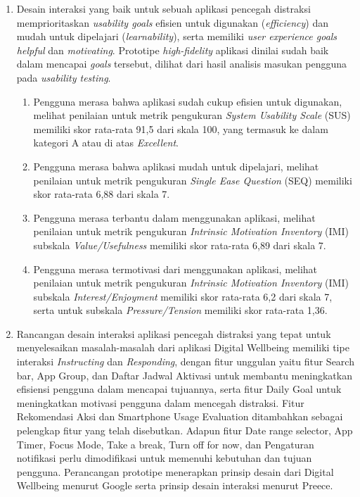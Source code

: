 \begin{enumerate}
  \item Desain interaksi yang baik untuk sebuah aplikasi pencegah distraksi memprioritaskan \textit{usability goals} efisien untuk digunakan (\textit{efficiency}) dan mudah untuk dipelajari (\textit{learnability}), serta memiliki \textit{user experience goals} \textit{helpful} dan \textit{motivating}. Prototipe \textit{high-fidelity} aplikasi dinilai sudah baik dalam mencapai \textit{goals} tersebut, dilihat dari hasil analisis masukan pengguna pada \textit{usability testing}.
    \begin{enumerate}[label=\alph*.]
      \item Pengguna merasa bahwa aplikasi sudah cukup efisien untuk digunakan, melihat penilaian untuk metrik pengukuran \textit{System Usability Scale} (SUS) memiliki skor rata-rata 91,5 dari skala 100, yang termasuk ke dalam kategori A atau di atas \textit{Excellent}. 
      
      \item Pengguna merasa bahwa aplikasi mudah untuk dipelajari, melihat penilaian untuk metrik pengukuran \textit{Single Ease Question} (SEQ) memiliki skor rata-rata 6,88 dari skala 7.
      
      \item Pengguna merasa terbantu dalam menggunakan aplikasi, melihat penilaian untuk metrik pengukuran \textit{Intrinsic Motivation Inventory} (IMI) subskala \textit{Value/Usefulness} memiliki skor rata-rata 6,89 dari skala 7.
      
      \item Pengguna merasa termotivasi dari menggunakan aplikasi, melihat penilaian untuk metrik pengukuran \textit{Intrinsic Motivation Inventory} (IMI) subskala \textit{Interest/Enjoyment} memiliki skor rata-rata 6,2 dari skala 7, serta untuk subskala \textit{Pressure/Tension} memiliki skor rata-rata 1,36.
        
    \end{enumerate}
    
  \item Rancangan desain interaksi aplikasi pencegah distraksi yang tepat untuk menyelesaikan masalah-masalah dari aplikasi Digital Wellbeing memiliki tipe interaksi \textit{Instructing} dan \textit{Responding}, dengan fitur unggulan yaitu fitur Search bar, App Group, dan Daftar Jadwal Aktivasi untuk membantu meningkatkan efisiensi pengguna dalam mencapai tujuannya, serta fitur Daily Goal untuk meningkatkan motivasi pengguna dalam mencegah distraksi. Fitur Rekomendasi Aksi dan Smartphone Usage Evaluation ditambahkan sebagai pelengkap fitur yang telah disebutkan. Adapun fitur Date range selector, App Timer, Focus Mode, Take a break, Turn off for now, dan Pengaturan notifikasi perlu dimodifikasi untuk memenuhi kebutuhan dan tujuan pengguna. Perancangan prototipe menerapkan prinsip desain dari Digital Wellbeing menurut Google serta prinsip desain interaksi menurut Preece.  
   
\end{enumerate}

